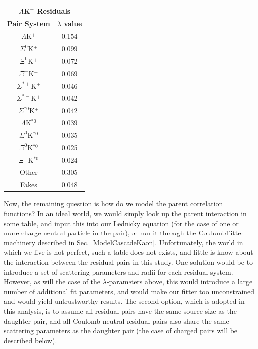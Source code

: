 \documentclass[../AnalysisNoteJBuxton.tex]{subfiles}
\begin{document}
\begin{table}[htbp]
 \centering
 \begin{tabular}{|c|c|}
  \multicolumn{2}{c}{$\Lambda$K$^{+}$ Residuals} \\
  \hline
  \textbf{Pair System} & \textbf{$\lambda$ value} \\
  \hline
  $\Lambda$K$^{+}$ & 0.154 \\
  $\Sigma^{0}$K$^{+}$ & 0.099 \\
  $\Xi^{0}$K$^{+}$ & 0.072 \\
  $\Xi^{-}$K$^{+}$ & 0.069 \\
  $\Sigma^{*+}$K$^{+}$ & 0.046 \\
  $\Sigma^{*-}$K$^{+}$ & 0.042 \\
  $\Sigma^{*0}$K$^{+}$ & 0.042 \\
  $\Lambda$K$^{*0}$ & 0.039 \\
  $\Sigma^{0}$K$^{*0}$ & 0.035 \\
  $\Xi^{0}$K$^{*0}$ & 0.025 \\
  $\Xi^{-}$K$^{*0}$ & 0.024 \\
  Other & 0.305 \\
  Fakes & 0.048 \\
  \hline
 \end{tabular}
 \label{tab:LambdaValues_10Res_LamKchP}
\end{table}



Now, the remaining question is how do we model the parent correlation functions?  In an ideal world, we would simply look up the parent interaction in some table, and input this into our Lednicky equation (for the case of one or more charge neutral particle in the pair), or run it through the CoulombFitter machinery described in Sec. \ref{ModelCascadeKaon}.  Unfortunately, the world in which we live is not perfect, such a table does not exists, and little is know about the interaction between the residual pairs in this study.  One solution would be to introduce a set of scattering parameters and radii for each residual system.  However, as will the case of the $\lambda$-parameters above, this would introduce a large number of additional fit parameters, and would make our fitter too unconstrained and would yield untrustworthy results.  The second option, which is adopted in this analysis, is to assume all residual pairs have the same source size as the daughter pair, and all Coulomb-neutral residual pairs also share the same scattering parameters as the daughter pair (the case of charged pairs will be described below).
\end{document}
